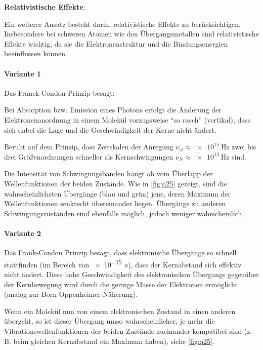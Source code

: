 \textbf{Relativistische Effekte}:

Ein weiterer Ansatz besteht darin, relativistische Effekte zu berücksichtigen. 
Insbesondere bei schweren Atomen wie den Übergangsmetallen sind relativistische Effekte wichtig, da sie die Elektronenstruktur und die Bindungsenergien beeinflussen können.

\label{q:25}

\paragraph{Variante 1}

Das Franck-Condon-Prinzip besagt: 
\begin{mdframed}[backgroundcolor=yellow!20] %
    Bei Absorption bzw. Emission eines Photons erfolgt die Änderung der Elektronenanordnung in einem Molekül vorzugsweise \enquote{so rasch} (vertikal), dass sich dabei die Lage und die Geschwindigkeit der Kerne nicht ändert.
\end{mdframed}

Beruht auf dem Prinzip, dass Zeitskalen der Anregung $\nu_{el} \approx \SI{e15}{\hertz}$ zwei bis drei Größenordnungen schneller als Kernschwingungen $\nu_{N} \approx \SI{e13}{\hertz}$ sind. 

Die Intensität von Schwingungsbanden hängt ab vom Überlapp der Wellenfunktionen der beiden Zustände. Wie in \autoref{fig:q25} gezeigt, sind die wahrscheinlichsten Übergänge (blau und grün) jene, deren Maximum der Wellenfunktionen senkrecht übereinander liegen. Übergänge zu anderen Schwingungszuständen sind ebenfalls möglich, jedoch weniger wahrscheinlich. 

\paragraph{Variante 2}

Das Frank-Condon Prinzip besagt, dass elektronische Übergänge so schnell stattfinden (im Bereich von \SI{e-15}{s}), dass der Kernabstand sich effektiv nicht ändert.
Diese hohe Geschwindigkeit des elektronischen Übergangs gegenüber der Kernbewegung wird durch die geringe Masse der Elektronen ermöglicht (analog zur Born-Oppenheimer-Näherung).

Wenn ein Molekül nun von einem elektronischen Zustand in einen anderen übergeht, so ist dieser Übergang umso wahrscheinlicher, je mehr die Vibrationswellenfunktionen der beiden Zustände zueinander kompatibel sind (z. B. beim gleichen Kernabstand ein Maximum haben), siehe \autoref{fig:q25}.

